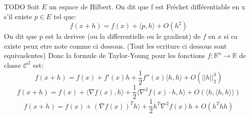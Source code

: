 \begin{definition}
\end{definition}
    
\begin{definition}
    TODO Soit $E$ un espace de Hilbert. On dit que f est Fréchet différentiable en x
    s'il existe $p \in E$ tel que:
    \begin{equation}
        f(x+h) = f(x)+ \langle p, h \rangle +O(h^2) 
    \end{equation}
    On dit que p est la derivee (ou la differentielle ou le gradient) de $f$ en $x$ si ca existe peux etre note comme ci dessous. (Tout les ecriture ci dessous sont equivaslentes) %
    Donc la formule de Taylor-Young pour les fonctions $f: \mathbb{R}^n\rightarrow\mathbb{R}$ de classe $\mathcal{C} ^2$ est: 
    \begin{equation}
        f(x+h) = f(x)+ f'(x) h  + \frac{1}{2} f''(x)\langle h, h \rangle +O(||h||^3_2)
    \end{equation}
    \begin{equation}
        f(x+h) = f(x)+ \langle \nabla f(x), h \rangle + \frac{1}{2} \langle \nabla^2 f(x)\cdot h, h \rangle +O(\langle h, \langle h, h\rangle \rangle)
    \end{equation}
    \begin{equation}
        f(x+h) = f(x)+ (\nabla f(x))^T h \rangle + \frac{1}{2} h^T \nabla^2 f(x) h +O(h^T h h)
    \end{equation}

\end{definition}